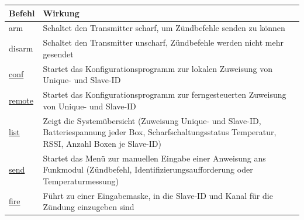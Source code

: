 \documentclass[paper=a4, parskip, numbers=noenddot, toc=listof, headsepline]{scrbook}
\begin{document}
					\begin{table}[bt]
						\begin{center}
							\begin{tabu}
								to .9\textwidth {lX}
								\hline\hline
								\textbf{Befehl}                       & \textbf{Wirkung}                                                                                                                                                                                                                   \\ \hline
								arm                                   & Schaltet den Transmitter scharf, um Zündbefehle senden zu können                                                                                                                                                                   \\
								disarm                                & Schaltet den Transmitter unscharf, Zündbefehle werden nicht mehr gesendet                                                                                                                                                          \\ \hline
								\hyperref[subsec:localconf]{conf}     & Startet das Konfigurationsprogramm zur lokalen Zuweisung von Unique- und Slave-ID                                                                                                                                                  \\
								\hyperref[subsec:remoteconf]{remote}  & Startet das Konfigurationsprogramm zur ferngesteuerten Zuweisung von Unique- und Slave-ID                                                                                                                                          \\
								\hyperref[sec:list]{list}             & Zeigt die Systemübersicht (Zuweisung Unique- und Slave-ID, Batteriespannung jeder Box, Scharfschaltungsstatus Temperatur, RSSI, Anzahl Boxen je Slave-ID)                                                                          \\ \hline
								\hyperref[sec:manuellessenden]{send}  & Startet das Menü zur manuellen Eingabe einer Anweisung ans Funkmodul (Zündbefehl, Identifizierungsaufforderung oder Temperaturmessung)                                                                                             \\
								\hyperref[sec:manuellessenden]{fire}  & Führt zu einer Eingabemaske, in die Slave-ID und Kanal für die Zündung einzugeben sind                                                                                                                                             \\

\end{tabu}
\end{center}
\end{table}
\end{document}
